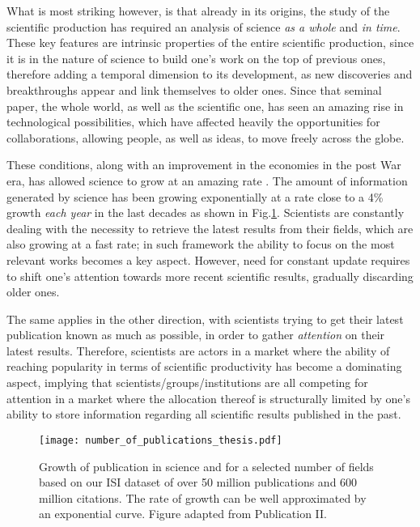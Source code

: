 What is most striking however, is that already in its origins, the study of the scientific production has required 
an analysis of science \textit{as a whole} and \textit{in time}. These key features are intrinsic properties of the entire
scientific production, since it is in the nature of science to build one's work on the top of previous ones, therefore adding a temporal dimension to
its development, as new discoveries and breakthroughs appear and link themselves to older ones. 
Since that seminal paper, the whole world, as well as the scientific one, has seen an amazing rise in technological possibilities,
which have affected heavily
the opportunities for collaborations, allowing people, as well as ideas, to move freely across the globe. 

These conditions, along with an improvement in
the economies in the post War era, has allowed science to grow at an amazing rate \cite{Larsen2010}. 
The amount of information generated by science has been growing exponentially at a rate close to a 4\% growth \textit{each year} in the last decades 
as shown in Fig.\ref{fig:growth_science}. Scientists are constantly dealing with the necessity to retrieve the latest results from their fields, which are also growing at
a fast rate; in such framework the ability to focus on the most relevant works becomes a key aspect. 
However, need for constant update requires to shift one's attention 
towards more recent scientific results, gradually discarding older ones. 

The same applies in the other direction, with scientists trying to get their latest publication known as much as possible, in order to gather \emph{attention} on their latest results. Therefore, scientists are actors in a market where the ability of reaching popularity in terms of scientific productivity has become a dominating aspect, implying that scientists/groups/institutions are all competing for attention in a market where the allocation thereof is structurally limited by one's ability to store information regarding all scientific results published in the past.


\begin{figure}[h!]
\centering
\texttt{[image: number\_of\_publications\_thesis.pdf]}%
\caption{Growth of publication in science and for a selected number of fields based on our ISI dataset of over 50 million publications and 600 million citations. The rate of growth can be well approximated by an exponential curve. Figure adapted from
Publication II.}\label{fig:growth_science}
\end{figure}

